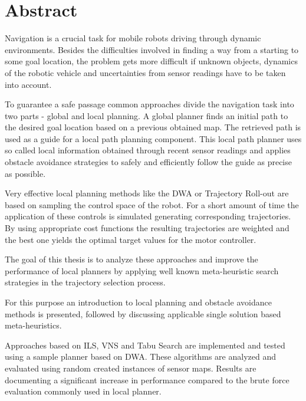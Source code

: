 \begingroup
\let\clearpage\relax
\let\cleardoublepage\relax
\let\cleardoublepage\relax

\chapter*{Abstract}
Navigation is a crucial task for mobile robots driving through dynamic environments.
Besides the difficulties involved in finding a way from a starting to some goal location, the problem gets more difficult if unknown objects, dynamics of the robotic vehicle and uncertainties from sensor readings have to be taken into account.

To guarantee a safe passage common approaches divide the navigation task into two parts - global and local planning.
A global planner finds an initial path to the desired goal location based on a previous obtained map. The retrieved path is used as a guide for a local path planning component.
This local path planner uses so called local information obtained through recent sensor readings and applies obstacle avoidance strategies to safely and efficiently follow the guide as precise as possible. 

Very effective local planning methods like the \ac{DWA} or Trajectory Roll-out are based on sampling the control space of the robot. For a short amount of time the application of these controls is simulated generating corresponding trajectories.
By using appropriate cost functions the resulting trajectories are weighted and the best one yields the optimal target values for the motor controller.

The goal of this thesis is to analyze these approaches and improve the performance of local planners by applying well known meta-heuristic search strategies in the trajectory selection process.

For this purpose an introduction to local planning and obstacle avoidance methods is presented, followed by discussing applicable single solution based meta-heuristics. 

Approaches based on \ac{ILS}, \ac{VNS} and Tabu Search are implemented and tested using a sample planner based on \ac{DWA}. These algorithms are analyzed and evaluated using random created instances of sensor maps. Results are documenting a significant increase in performance compared to the brute force evaluation commonly used in local planner. 

